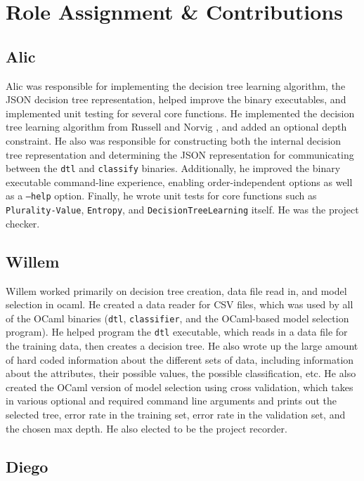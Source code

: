 \documentclass[screen, authorversion, nonacm, sigconf]{acmart}
\begin{document}
\section{Role Assignment \& Contributions}

\subsection{Alic}

Alic was responsible for implementing the decision tree learning algorithm, the JSON decision tree representation, helped improve the binary executables, and implemented unit testing for several core functions. He implemented the decision tree learning algorithm from Russell and Norvig \cite{russell_norvig_2010}, and added an optional depth constraint. He also was responsible for constructing both the internal decision tree representation and determining the JSON representation for communicating between the \texttt{dtl} and \texttt{classify} binaries. Additionally, he improved the binary executable command-line experience, enabling order-independent options as well as a \texttt{--help} option. Finally, he wrote unit tests for core functions such as \texttt{Plurality-Value}, \texttt{Entropy}, and \texttt{DecisionTreeLearning} itself. He was the project checker.

\subsection{Willem}

Willem worked primarily on decision tree creation, data file read in, and model selection in ocaml. He created a data reader for CSV files, which was used by all of the OCaml binaries (\texttt{dtl}, \texttt{classifier}, and the OCaml-based model selection program). He helped program the \texttt{dtl} executable, which reads in a data file for the training data, then creates a decision tree. He also wrote up the large amount of hard coded information about the different sets of data, including information about the attributes, their possible values, the possible classification, etc. He also created the OCaml version of model selection using cross validation, which takes in various optional and required command line arguments and prints out the selected tree, error rate in the training set, error rate in the validation set, and the chosen max depth. He also elected to be the project recorder.

\subsection{Diego}
\end{document}
